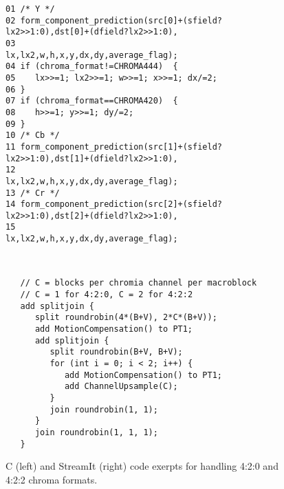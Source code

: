 \label{section:chroma}

\begin{figure*}[t]
  \vspace{-6pt}
 \begin{minipage}[t]{4.1in}{
  \begin{scriptsize}
   \begin{verbatim}
01 /* Y */
02 form_component_prediction(src[0]+(sfield?lx2>>1:0),dst[0]+(dfield?lx2>>1:0),
03                           lx,lx2,w,h,x,y,dx,dy,average_flag);
04 if (chroma_format!=CHROMA444)  {
05    lx>>=1; lx2>>=1; w>>=1; x>>=1; dx/=2;
06 }
07 if (chroma_format==CHROMA420)  {
08    h>>=1; y>>=1; dy/=2;
09 }
10 /* Cb */
11 form_component_prediction(src[1]+(sfield?lx2>>1:0),dst[1]+(dfield?lx2>>1:0),
12                           lx,lx2,w,h,x,y,dx,dy,average_flag);
13 /* Cr */
14 form_component_prediction(src[2]+(sfield?lx2>>1:0),dst[2]+(dfield?lx2>>1:0),
15                           lx,lx2,w,h,x,y,dx,dy,average_flag);    
   \end{verbatim}
  \end{scriptsize}
 }
 \label{fig:chroma-stream}
\vspace{-12pt}
 \end{minipage}
 ~\vrule
 \begin{minipage}[t]{4.3in}{
  \begin{scriptsize}
   \begin{verbatim}
   // C = blocks per chromia channel per macroblock 
   // C = 1 for 4:2:0, C = 2 for 4:2:2
   add splitjoin {
      split roundrobin(4*(B+V), 2*C*(B+V));
      add MotionCompensation() to PT1;
      add splitjoin {
         split roundrobin(B+V, B+V);
         for (int i = 0; i < 2; i++) {
            add MotionCompensation() to PT1;
            add ChannelUpsample(C);
         }
         join roundrobin(1, 1);
      }
      join roundrobin(1, 1, 1);
   }
   \end{verbatim}
  \end{scriptsize}
 }
 \vspace{-12pt}
 \end{minipage}
 \caption{C (left) and StreamIt (right) code exerpts for handling
          4:2:0 and 4:2:2 chroma formats.} %
 \label{fig:chroma-format-code}
 \vspace{-8pt}
\end{figure*}

